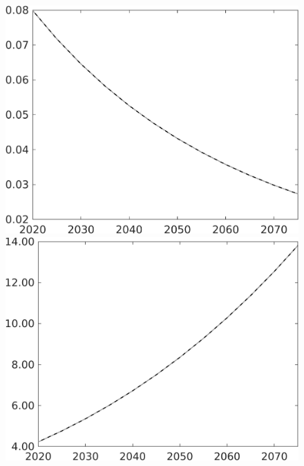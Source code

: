 \documentclass[12pt]{article}
\begin{document}
\begin{figure}[h!!]
\begin{minipage}[]{0.32\textwidth}
	\end{minipage}		
	\begin{minipage}[]{0.32\textwidth}
		\includegraphics[width=1\textwidth]{../../codding_model/own_basedOnFried/optimalPol_010922_revision/figures/all_13Sept22/CompTaul_LFBAU_Reg0_pepn_spillover0_nsk1_xgr0_knspil1_sep1_countec0_GovRev0_etaa0.79_lgd0.png}
	\end{minipage}	
	\begin{minipage}[]{0.32\textwidth}
		\includegraphics[width=1\textwidth]{../../codding_model/own_basedOnFried/optimalPol_010922_revision/figures/all_13Sept22/CompTaul_LFBAU_Reg0_pgpftf_spillover0_nsk1_xgr0_knspil1_sep1_countec0_GovRev0_etaa0.79_lgd0.png}

\end{minipage}
\end{figure}
\end{document}

